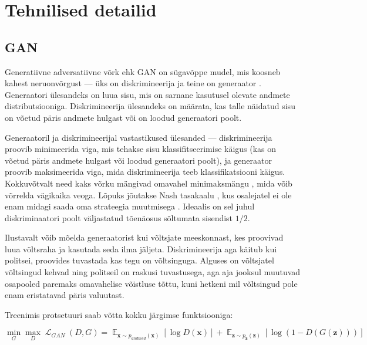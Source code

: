 \documentclass{vilgym}
\DeclareMathOperator{\EX}{\mathbb{E}}
\DeclareMathOperator{\loss}{\mathcal{L}}
\begin{document}
	\section{Tehnilised detailid}
	\subsection{GAN}
	Generatiivne adversatiivne võrk ehk GAN  on sügavõppe mudel, mis koosneb kahest neruonvõrgust --- üks on diskrimineerija  ja teine on generaator .  Generaatori ülesandeks on luua sisu, mis on sarnane kasutusel olevate andmete distributsiooniga. Diskrimineerija ülesandeks on määrata, kas talle näidatud sisu on võetud päris andmete hulgast või on loodud generaatori poolt.
	
	Generaatoril ja diskrimineerijal vastastikused ülesanded --- diskrimineerija proovib minimeerida viga, mis tehakse sisu klassifitseerimise käigus (kas on võetud päris andmete hulgast või loodud generaatori poolt), ja generaator proovib maksimeerida viga, mida diskrimineerija teeb klassifikatsiooni käigus. Kokkuvõtvalt need kaks võrku mängivad omavahel minimaksmängu , mida võib võrrelda vägikaika veoga. Lõpuks jõutakse Nash tasakaalu , kus osalejatel ei ole enam midagi saada oma strateegia muutmisega \parencite{gametheory}. Ideaalis on sel juhul diskriminaatori poolt väljastatud tõenäosus sõltumata sisendist $ 1/2 $.

	Ilustavalt võib mõelda generaatorist kui võltsjate meeskonnast, kes proovivad luua võltsraha ja kasutada seda ilma jäljeta. Diskrimineerija aga käitub kui politsei, proovides tuvastada kas tegu on võltsinguga. Alguses on võltsjatel võltsingud kehvad ning politseil on raskusi tuvastusega, aga aja jooksul muutuvad osapooled paremaks omavahelise võistluse tõttu, kuni hetkeni mil võltsingud pole enam eristatavad päris valuutast.

	Treenimis protsetuuri saab võtta kokku järgimse funktsiooniga:

	\begin{equation}
		\operatorname*{min}_G \operatorname*{max}_D \loss_{GAN}(D,G) = \EX_{\boldsymbol{x}\sim p_{andmed}(\boldsymbol{x})}[\log D(\boldsymbol{x})] + \EX_{\boldsymbol{z}\sim p_{\boldsymbol{z}}(\boldsymbol{z})}[\log(1-D(G(\boldsymbol{z})))]
	\end{equation}
\end{document}
